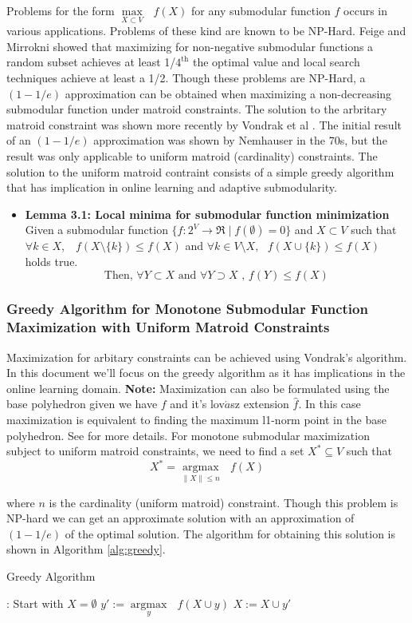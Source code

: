 Problems for the form $\underset{X\subset V}{\operatorname{max }}\text{ } f(X)$ for any submodular function $f$ occurs in various applications. Problems of these kind are known to be NP-Hard. Feige and Mirrokni \cite{Feige07maximizingnon-monotone} showed that maximizing for non-negative submodular functions a random subset achieves at least 1/$4^{\text{th}}$ the optimal value and local search techniques achieve at least a 1/2. Though these problems are NP-Hard, a $(1 - 1/e)$ approximation can be obtained when maximizing a non-decreasing submodular function under matroid constraints.
The solution to the arbritary matroid constraint was shown more recently by Vondrak et al \cite{Vondrak}. The initial result of an $(1 - 1/e)$ approximation was shown by Nemhauser  \cite{Nemhauser} in the 70s, but the result was only applicable to uniform matroid (cardinality) constraints. The solution to the uniform matroid contraint consists of a simple greedy algorithm that has implication in online learning and adaptive submodularity.
\begin{itemize}
 \item {\bf Lemma 3.1: Local minima for submodular function minimization} \\ Given a submodular function $\{f:2^V \rightarrow \Re \mid f(\emptyset) = 0\}$ and  $X \subset V$ such that $\forall k \in X$, $\text{ }f(X\setminus \{k\}) \leq f(X)$  and $\forall k \in V\setminus X, \text{ } f(X\cup \{k\}) \leq f(X)$ holds true.
 \[ \text{Then, } \forall Y\subset X \text{ and } \forall Y\supset X \text{ , }f(Y) \leq f(X) \] 
\end{itemize}
\subsubsection{Greedy Algorithm for Monotone Submodular Function Maximization with Uniform Matroid Constraints}
Maximization for arbitary constraints can be achieved using Vondrak's algorithm. In this document we'll focus on the greedy algorithm as it has implications in the online learning domain. {\bf Note:} Maximization can also be formulated using the base polyhedron given we have $f$ and it's lov$\acute{a}$sz extension $\hat{f}$. In this case maximization is equivalent to finding the maximum l1-norm point in the base polyhedron. See \cite{Bach} for more details.
For monotone submodular maximization subject to uniform matroid constraints, we need to find a set $X^*\subseteq V$ such that
\[
 X^* = \underset{\|X\| \leq n}{\operatorname{argmax }}\text{ }f(X)
\]

where $n$ is the cardinality (uniform matroid) constraint. Though this problem is NP-hard we can get an approximate solution with an approximation of $(1-1/e)$ of the optimal solution.  The algorithm for obtaining this solution is shown in Algorithm \ref{alg:greedy}.
\begin{algorithm}[htb]
\caption{Greedy Algorithm}
\label{alg:greedy}
\begin{algorithmic}[1]
\footnotesize
{}: Start with $X = \emptyset$
  \State $y':= \underset{y}{\operatorname{argmax }}\text{ }f(X\cup {y}) $
  \State $X := X \cup {y'}$
\EndFor
\end{algorithmic}
\end{algorithm}

